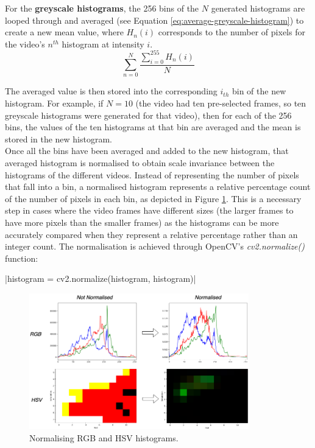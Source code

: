 For the \textbf{greyscale histograms}, the 256 bins of the $N$ generated histograms are looped through and averaged (see Equation \ref{eq:average-greyscale-histogram}) to create a new mean value, where $H_n(i)$ corresponds to the number of pixels for the video's $n^{th}$ histogram at intensity $i$.
\begin{equation}
\label{eq:average-greyscale-histogram}
    \sum_{n=0}^{N} \frac{\sum_{i=0}^{255} H_n(i)}{N}
\end{equation}

The averaged value is then stored into the corresponding $i_{th}$ bin of the new histogram. For example, if $N=10$ (the video had ten pre-selected frames, so ten greyscale histograms were generated for that video), then for each of the 256 bins, the values of the ten histograms at that bin are averaged and the mean is stored in the new histogram.\\

Once all the bins have been averaged and added to the new histogram, that averaged histogram is normalised to obtain scale invariance between the histograms of the different videos. Instead of representing the number of pixels that fall into a bin, a normalised histogram represents a relative percentage count of the number of pixels in each bin, as depicted in Figure \ref{fig:implementation-normalise-histogram}. This is a necessary step in cases where the video frames have different sizes (the larger frames to have more pixels than the smaller frames) as the histograms can be more accurately compared when they represent a relative percentage rather than an integer count. The normalisation is achieved through OpenCV's \textit{cv2.normalize()} function:

|histogram = cv2.normalize(histogram, histogram)|

\begin{figure}[h] 
\centerline{\includegraphics[width=0.85\textwidth]{figures/implementation/normalise-histogram.png}}
\caption{\label{fig:implementation-normalise-histogram}Normalising RGB and HSV histograms.}
\end{figure}

